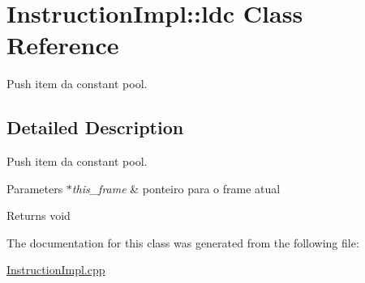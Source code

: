 \hypertarget{class_instruction_impl_1_1ldc}{}\section{Instruction\+Impl\+:\+:ldc Class Reference}
\label{class_instruction_impl_1_1ldc}


Push item da constant pool.  




\subsection{Detailed Description}
Push item da constant pool. 


\begin{DoxyParams}{Parameters}
{\em $\ast$this\+\_\+frame} & ponteiro para o frame atual \\
\hline
\end{DoxyParams}
\begin{DoxyReturn}{Returns}
void 
\end{DoxyReturn}


The documentation for this class was generated from the following file\+:\begin{DoxyCompactItemize}
\item 
\hyperlink{_instruction_impl_8cpp}{Instruction\+Impl.\+cpp}\end{DoxyCompactItemize}
